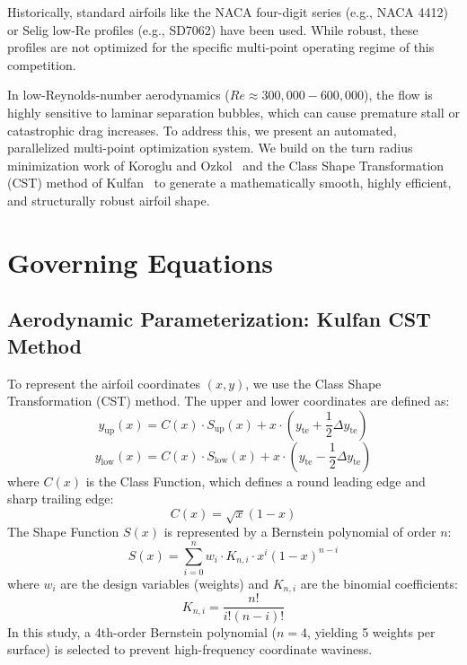 \documentclass[11pt]{article}
\begin{document}
Historically, standard airfoils like the NACA four-digit series (e.g., NACA 4412) or Selig low-Re profiles (e.g., SD7062) have been used. While robust, these profiles are not optimized for the specific multi-point operating regime of this competition. 

In low-Reynolds-number aerodynamics ($Re \approx 300,000 - 600,000$), the flow is highly sensitive to laminar separation bubbles, which can cause premature stall or catastrophic drag increases. To address this, we present an automated, parallelized multi-point optimization system. We build on the turn radius minimization work of Koroglu and Ozkol~\cite{koroglu2019} and the Class Shape Transformation (CST) method of Kulfan~\cite{kulfan2008} to generate a mathematically smooth, highly efficient, and structurally robust airfoil shape.

\section{Governing Equations}

\subsection{Aerodynamic Parameterization: Kulfan CST Method}
To represent the airfoil coordinates $(x, y)$, we use the Class Shape Transformation (CST) method. The upper and lower coordinates are defined as:
\begin{equation}
    y_{\text{up}}(x) = C(x) \cdot S_{\text{up}}(x) + x \cdot \left( y_{\text{te}} + \frac{1}{2} \Delta y_{\text{te}} \right)
\end{equation}
\begin{equation}
    y_{\text{low}}(x) = C(x) \cdot S_{\text{low}}(x) + x \cdot \left( y_{\text{te}} - \frac{1}{2} \Delta y_{\text{te}} \right)
\end{equation}
where $C(x)$ is the Class Function, which defines a round leading edge and sharp trailing edge:
\begin{equation}
    C(x) = \sqrt{x}(1-x)
\end{equation}
The Shape Function $S(x)$ is represented by a Bernstein polynomial of order $n$:
\begin{equation}
    S(x) = \sum_{i=0}^n w_i \cdot K_{n,i} \cdot x^i (1-x)^{n-i}
\end{equation}
where $w_i$ are the design variables (weights) and $K_{n,i}$ are the binomial coefficients:
\begin{equation}
    K_{n,i} = \frac{n!}{i!(n-i)!}
\end{equation}
In this study, a 4th-order Bernstein polynomial ($n=4$, yielding 5 weights per surface) is selected to prevent high-frequency coordinate waviness.
\end{document}
